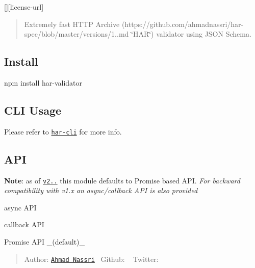 \mbox{[}\mbox{]}\mbox{[}license-\/url\mbox{]} \href{https://www.npmjs.com/package/har-validator}{\tt } \href{https://circleci.com/gh/ahmadnassri/workflows/node-har-validator}{\tt }

\begin{quote}
Extremely fast H\+T\+TP Archive (https\+://github.com/ahmadnassri/har-\/spec/blob/master/versions/1..\+md \char`\"{}\+H\+A\+R\char`\"{}) validator using J\+S\+ON Schema. \end{quote}


\subsection*{Install}


\begin{DoxyCode}
npm install har-validator
\end{DoxyCode}


\subsection*{C\+LI Usage}

Please refer to \href{https://github.com/ahmadnassri/har-cli}{\tt {\ttfamily har-\/cli}} for more info.

\subsection*{A\+PI}

{\bfseries Note}\+: as of \href{https://github.com/ahmadnassri/node-har-validator/releases/tag/v2.0.0}{\tt {\ttfamily v2..}} this module defaults to Promise based A\+PI. {\itshape For backward compatibility with {\ttfamily v1.\+x} an async/callback A\+PI is also provided}


\begin{DoxyItemize}
\item async A\+PI
\item callback A\+PI
\item Promise A\+PI \+\_\+(default)\+\_\+ 

 \begin{quote}
Author\+: \href{https://www.ahmadnassri.com/}{\tt Ahmad Nassri} \textbullet{} Github\+: \href{https://github.com/ahmadnassri}{\tt } \textbullet{} Twitter\+: \href{https://twitter.com/ahmadnassri}{\tt } \end{quote}

\end{DoxyItemize}